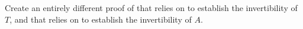 Create an entirely different proof of   that relies on  to establish the invertibility of $T$, and that relies on  to establish the invertibility of $A$.
